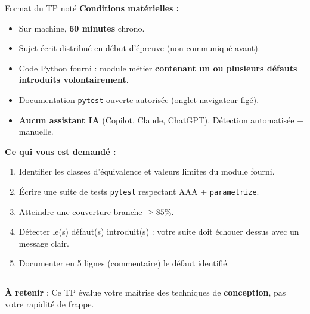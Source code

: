 \documentclass[aspectratio=169,11pt]{beamer}
\newcommand{\takeaway}[1]{%
\vfill\begin{beamercolorbox}[wd=\linewidth,sep=0.4em]{}
\color{accent2}\rule[0.6ex]{1.2em}{1.2pt}\hspace{0.4em}%
\textbf{\color{accent2}\small À retenir} \textcolor{textsoft}{:} %
{\small\color{textmain}#1}
\end{beamercolorbox}}
\begin{document}
\begin{frame}[t,shrink=12]{Format du TP noté}
\footnotesize
\textbf{Conditions matérielles :}
\begin{itemize}\itemsep0.1em
\item Sur machine, \textbf{60 minutes} chrono.
\item Sujet écrit distribué en début d'épreuve (non communiqué avant).
\item Code Python fourni : module métier \textbf{contenant un ou plusieurs défauts introduits volontairement}.
\item Documentation \texttt{pytest} ouverte autorisée (onglet navigateur figé).
\item \textbf{Aucun assistant IA} (Copilot, Claude, ChatGPT). Détection automatisée + manuelle.
\end{itemize}
\vspace{0.4cm}
\textbf{Ce qui vous est demandé :}
\begin{enumerate}\itemsep0.1em
\item Identifier les classes d'équivalence et valeurs limites du module fourni.
\item Écrire une suite de tests \texttt{pytest} respectant AAA + \texttt{parametrize}.
\item Atteindre une couverture branche \textbf{$\geq 85\%$}.
\item Détecter le(s) défaut(s) introduit(s) : votre suite doit échouer dessus avec un message clair.
\item Documenter en 5 lignes (commentaire) le défaut identifié.
\end{enumerate}
\takeaway{Ce TP évalue votre maîtrise des techniques de \textbf{conception}, pas votre rapidité de frappe.}
\end{frame}
\end{document}
